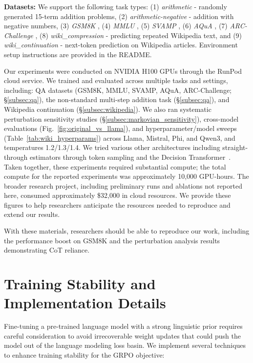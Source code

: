 \documentclass{article} %
\begin{document}
\textbf{Datasets:} We support the following task types: (1) \textit{arithmetic} - randomly generated 15-term addition problems, (2) \textit{arithmetic-negative} - addition with negative numbers, (3) \textit{GSM8K} \citep{cobbe2021gsm8k}, (4) \textit{MMLU} \citep{hendrycks2020mmlu}, (5) \textit{SVAMP} \citep{patel2021svamp}, (6) \textit{AQuA} \citep{ling2017aqua}, (7) \textit{ARC-Challenge} \citep{clark2018arc}, (8) \textit{wiki\_compression} - predicting repeated Wikipedia text, and (9) \textit{wiki\_continuation} - next-token prediction on Wikipedia articles. Environment setup instructions are provided in the README. 

Our experiments were conducted on NVIDIA H100 GPUs through the RunPod cloud service. We trained and evaluated across multiple tasks and settings, including: QA datasets (GSM8K, MMLU, SVAMP, AQuA, ARC-Challenge; \S\ref{subsec:qa}), the non-standard multi-step addition task (\S\ref{subsec:qa}), and Wikipedia continuation (\S\ref{subsec:wikipedia}). We also ran systematic perturbation sensitivity studies (\S\ref{subsec:markovian_sensitivity}), cross-model evaluations (Fig.~\ref{fig:original_vs_llama}), and hyperparameter/model sweeps (Table~\ref{tab:wiki_hyperparams}) across Llama, Mistral, Phi, and Qwen3, and temperatures 1.2/1.3/1.4. We tried various other architectures including straight-through estimators through token sampling and the Decision Transformer~\citep{chen2021decisiontransformer}. Taken together, these experiments required substantial compute; the total compute for the reported experiments was approximately 10{,}000 GPU-hours. The broader research project, including preliminary runs and ablations not reported here, consumed approximately \$32{,}000 in cloud resources. We provide these figures to help researchers anticipate the resources needed to reproduce and extend our results.

With these materials, researchers should be able to reproduce our work, including the performance boost on GSM8K and the perturbation analysis results demonstrating CoT reliance.





\appendix
\section{Training Stability and Implementation Details}
\label{subsec:stability}
Fine-tuning a pre-trained language model with a strong linguistic prior requires careful consideration to avoid irrecoverable weight updates that could push the model out of the language modeling loss basin. We implement several techniques to enhance training stability for the GRPO objective:
\end{document}
